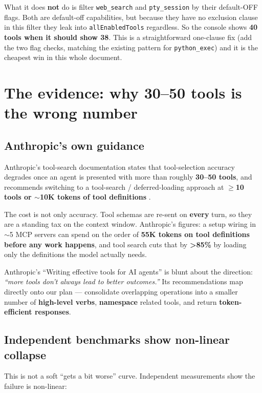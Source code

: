 \documentclass[11pt]{article}
\begin{document}
What it does \textbf{not} do is filter \texttt{web\_search} and
\texttt{pty\_session} by their default-OFF flags. Both are default-off
capabilities, but because they have no exclusion clause in this filter they leak
into \texttt{allEnabledTools} regardless. So the console shows \textbf{40 tools
when it should show 38}. This is a straightforward one-clause fix (add the two
flag checks, matching the existing pattern for \texttt{python\_exec}) and it is
the cheapest win in this whole document.

\section{The evidence: why 30--50 tools is the wrong number}

\subsection{Anthropic's own guidance}

Anthropic's tool-search documentation states that tool-selection accuracy
degrades once an agent is presented with more than roughly \textbf{30--50 tools},
and recommends switching to a tool-search / deferred-loading approach at
\textbf{$\geq$10 tools or $\sim$10K tokens of tool definitions}
\citep{anthropic-toolsearch,anthropic-sdk-toolsearch}.

The cost is not only accuracy. Tool schemas are re-sent on \textbf{every} turn,
so they are a standing tax on the context window. Anthropic's figures: a setup
wiring in $\sim$5 MCP servers can spend on the order of \textbf{55K tokens on
tool definitions before any work happens}, and tool search cuts that by
\textbf{{>}85\%} by loading only the definitions the model actually needs.

Anthropic's ``Writing effective tools for AI agents''
\citep{anthropic-writingtools} is blunt about the direction: \textit{``more tools
don't always lead to better outcomes.''} Its recommendations map directly onto
our plan --- consolidate overlapping operations into a smaller number of
\textbf{high-level verbs}, \textbf{namespace} related tools, and return
\textbf{token-efficient responses}.

\subsection{Independent benchmarks show non-linear collapse}

This is not a soft ``gets a bit worse'' curve. Independent measurements show the
failure is non-linear:
\end{document}
